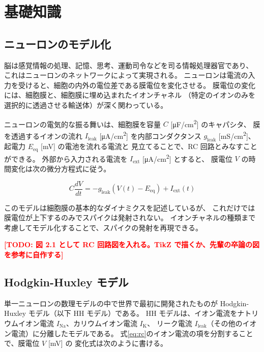 \documentclass[a4paper,11pt,openany]{ltjsreport}
\newcommand{\TODO}[1]{\textcolor{red}{\textbf{[TODO: #1]}}}
\newcommand{\Iext}{I_{\mathrm{ext}}}
\newcommand{\gleak}{g_{\mathrm{leak}}}
\newcommand{\Ileak}{I_{\mathrm{leak}}}
\newcommand{\INa}{I_{\mathrm{Na}}}
\newcommand{\IK}{I_{\mathrm{K}}}
\begin{document}
\chapter{基礎知識}

\section{ニューロンのモデル化}

脳は感覚情報の処理、記憶、思考、運動司令などを司る情報処理器官であり、
これはニューロンのネットワークによって実現される。
ニューロンは電流の入力を受けると、細胞の内外の電位差である膜電位を変化させる。
膜電位の変化には、細胞膜と、細胞膜に埋め込まれたイオンチャネル
（特定のイオンのみを選択的に透過させる輸送体）が深く関わっている。

ニューロンの電気的な振る舞いは、細胞膜を容量 $C$ [\si{\micro F/cm^2}] のキャパシタ、
膜を透過するイオンの流れ $\Ileak$ [\si{\micro A/cm^2}] を内部コンダクタンス
$\gleak$ [\si{mS/cm^2}]、起電力 $E_{\mathrm{eq}}$ [\si{mV}] の電池を流れる電流と
見立てることで、RC 回路とみなすことができる\cite{miyagawa2013}。
外部から入力される電流を $\Iext$ [\si{\micro A/cm^2}] とすると、
膜電位 $V$ の時間変化は次の微分方程式に従う。

\begin{equation}
  C \frac{dV}{dt} = -\gleak\left(V(t) - E_{\mathrm{eq}}\right) + \Iext(t)
  \label{eq:rc}
\end{equation}

このモデルは細胞膜の基本的なダイナミクスを記述しているが、
これだけでは膜電位が上下するのみでスパイクは発射されない。
イオンチャネルの種類まで考慮してモデル化することで、スパイクの発射を再現できる。

\TODO{図 2.1 として RC 回路図を入れる。TikZ で描くか、先輩の卒論の図を参考に自作する}

\section{Hodgkin-Huxley モデル}
\label{sec:hh}

単一ニューロンの数理モデルの中で世界で最初に開発されたものが
Hodgkin-Huxley モデル（以下 HH モデル）である\cite{hodgkin1952}。
HH モデルは、イオン電流をナトリウムイオン電流 $\INa$、カリウムイオン電流 $\IK$、
リーク電流 $\Ileak$（その他のイオン電流）に分離したモデルである。
式\eqref{eq:rc}のイオン電流の項を分割することで、膜電位 $V$ [\si{mV}] の
変化式は次のように書ける。
\end{document}

